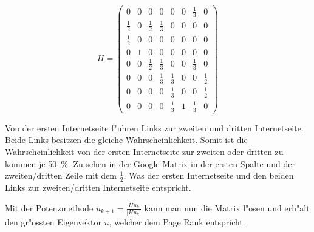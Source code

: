 \begin{refsection}
\begin{beispiel}
\[
    H =
    \begin{pmatrix}
      0 & 0 & 0 & 0 & 0 & 0 & \frac{1}{3} & 0\\
      \frac{1}{2} & 0 & \frac{1}{2} & \frac{1}{3} & 0 & 0 & 0 & 0\\
      \frac{1}{2} & 0 & 0 & 0 & 0 & 0 & 0 & 0\\
      0 & 1 & 0 & 0 & 0 & 0 & 0 & 0\\
      0 & 0 & \frac{1}{2} & \frac{1}{3} & 0 & 0 &
        \frac{1}{3} & 0\\
      0 & 0 & 0 & \frac{1}{3} & \frac{1}{3} & 0 & 0 & \frac{1}{2}\\
      0 & 0 & 0 & 0 & \frac{1}{3} & 0 & 0 & \frac{1}{2}\\
      0 & 0 & 0 & 0 & \frac{1}{3} & 1 & \frac{1}{3} & 0
    \end{pmatrix}
\]

Von der ersten Internetseite f"uhren Links zur zweiten und dritten
Internetseite.  Beide Links besitzen die gleiche Wahrscheinlichkeit.
Somit ist die Wahrscheinlichkeit von der ersten Internetseite zur
zweiten oder dritten zu kommen je \SI{50}{\percent}.  Zu sehen in
der Google Matrix in der ersten Spalte und der zweiten/dritten Zeile
mit dem $\frac{1}{2}$.  Was der ersten Internetseite und den beiden
Links zur zweiten/dritten Internetseite entspricht.

Mit der Potenzmethode $u_{k+1} = \frac{Hu_k}{|Hu_k|}$ kann man nun
die Matrix l"osen und erh"alt den gr"ossten Eigenvektor $u$,
welcher dem Page Rank entspricht.
\end{beispiel}


\end{refsection}
